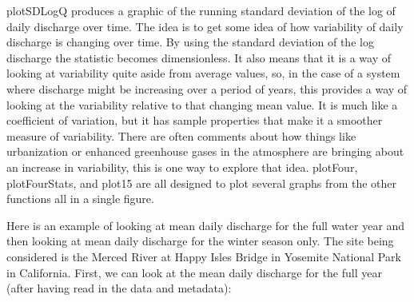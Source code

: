 \documentclass[a4paper,11pt]{article}\usepackage[]{graphicx}\usepackage[]{color}
\begin{document}
plotSDLogQ produces a graphic of the running standard deviation of the log of daily discharge over time.  The idea is to get some idea of how variability of daily discharge is changing over time.  By using the standard deviation of the log discharge the statistic becomes dimensionless.  It also means that it is a way of looking at variability quite aside from average values, so, in the case of a system where discharge might be increasing over a period of years, this provides a way of looking at the variability relative to that changing mean value.  It is much like a coefficient of variation, but it has sample properties that make it a smoother measure of variability.  There are often comments about how things like urbanization or enhanced greenhouse gases in the atmosphere are bringing about an increase in variability, this is one way to explore that idea. plotFour, plotFourStats, and plot15 are all designed to plot several graphs from the other functions all in a single figure. 

Here is an example of looking at mean daily discharge for the full water year and then looking at mean daily discharge for the winter season only.  The site being considered is the Merced River at Happy Isles Bridge in Yosemite National Park in California.  First, we can look at the mean daily discharge for the full year (after having read in the data and metadata):
\end{document}
